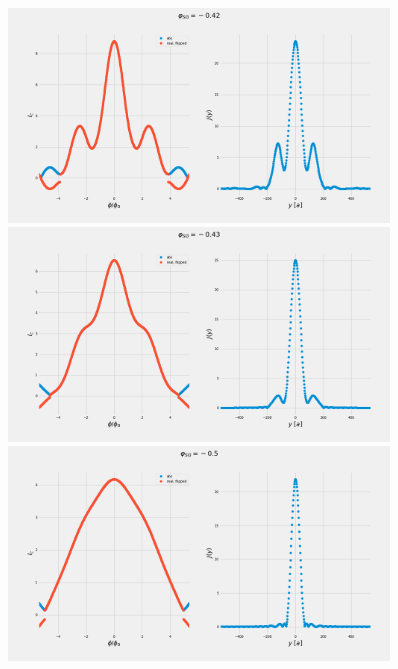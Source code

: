 \documentclass[a4paper]{article}
\begin{document}
\begin{figure}
	\includegraphics[width=0.9\textwidth]{figs/wg32double/current_and_density_042}
	\includegraphics[width=0.9\textwidth]{figs/wg32double/current_and_density_043}
	\includegraphics[width=0.9\textwidth]{figs/wg32double/current_and_density_05}
\end{figure}
\end{document}
